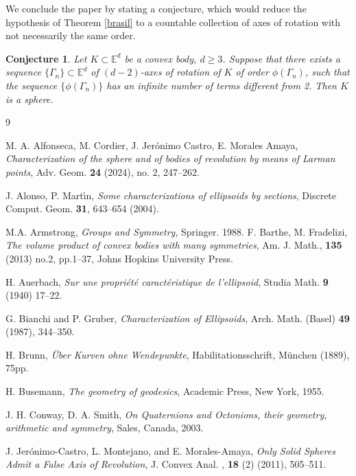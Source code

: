 \documentclass[12pt,thmsa]{amsart}
\newcommand{\Ed}{\mathbb{E}^{d}}
\newtheorem{conjecture}{Conjecture}
\begin{document}
We conclude the paper by stating a conjecture, which would reduce the hypothesis of Theorem \ref{brasil} to a countable collection of axes of rotation with not necessarily the same order.

\begin{conjecture}
Let $K\subset \Ed$ be a convex body, $d\geq 3$. Suppose that there exists a sequence $\{\Gamma_n\}\subset \Ed $ of $(d-2)$-axes of rotation of $K$ of order $\phi(\Gamma_n)$, such that the sequence $\{\phi(\Gamma_n)\}$ has an infinite number of terms different from 2. Then $K$ is a sphere.
\end{conjecture}
\begin{thebibliography}{9}

   M. A. Alfonseca,   M. Cordier, J. Jerónimo Castro, E. Morales Amaya, \textit{ Characterization of the sphere and of bodies of revolution by means of Larman points},
    Adv. Geom. {\bf 24} (2024), no. 2, 247--262.
    
     J. Alonso, P. Mart\' \i n, \textit{Some characterizations of ellipsoids by sections}, 
    Discrete Comput. Geom. {\bf 31}, 643--654 (2004).

 M.A. Armstrong, \textit{ Groups and Symmetry}, Springer. 1988.
 F. Barthe, M. Fradelizi, \textit{ The volume product of convex bodies with many symmetries},  Am. J. Math.,  {\bf 135} (2013) no.2, pp.1--37, Johns Hopkins University Press. %

 H. Auerbach, \textit{Sur une propri\'et\'e caract\'eristique de l’ellipsoid}, Studia Math.
{\bf 9} (1940) 17--22.



 G. Bianchi and P. Gruber, \textit{ Characterization of Ellipsoids},
Arch. Math. (Basel)  {\bf 49} (1987), 344--350.

 H. Brunn, \textit{ \"Uber Kurven ohne Wendepunkte}, Habilitationsschrift, M\"unchen (1889), 75pp.

 H. Busemann, \textit{ The geometry of geodesics}, Academic Press, New York, 1955.
 
 J. H. Conway, D. A. Smith, \textit{ On Quaternions and Octonions, their geo\-metry, arithmetic and symmetry}, Sales, Canada, 2003.

 J. Jer\'onimo-Castro, L. Montejano,  and E.  Morales-Amaya, \textit{ Only Solid Spheres Admit a False Axis of Revolution},  J. Convex Anal. ,  {\bf 18} (2) (2011), 505--511.
 

\end{thebibliography}
\end{document}
